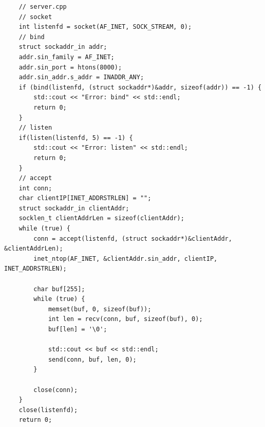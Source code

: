 \documentclass[11pt]{book}
\begin{document}
\begin{lstlisting}
	// server.cpp
    // socket
    int listenfd = socket(AF_INET, SOCK_STREAM, 0);
    // bind
    struct sockaddr_in addr;
    addr.sin_family = AF_INET;
    addr.sin_port = htons(8000);
    addr.sin_addr.s_addr = INADDR_ANY;
    if (bind(listenfd, (struct sockaddr*)&addr, sizeof(addr)) == -1) {
        std::cout << "Error: bind" << std::endl;
        return 0;
    }
    // listen
    if(listen(listenfd, 5) == -1) {
        std::cout << "Error: listen" << std::endl;
        return 0;
    }
    // accept
    int conn;
    char clientIP[INET_ADDRSTRLEN] = "";
    struct sockaddr_in clientAddr;
    socklen_t clientAddrLen = sizeof(clientAddr);
    while (true) {
        conn = accept(listenfd, (struct sockaddr*)&clientAddr, &clientAddrLen);
        inet_ntop(AF_INET, &clientAddr.sin_addr, clientIP, INET_ADDRSTRLEN);

        char buf[255];
        while (true) {
            memset(buf, 0, sizeof(buf));
            int len = recv(conn, buf, sizeof(buf), 0);
            buf[len] = '\0';

            std::cout << buf << std::endl;
            send(conn, buf, len, 0);
        }
        
        close(conn);
    }
    close(listenfd);
    return 0;
	\end{lstlisting}
\end{document}
